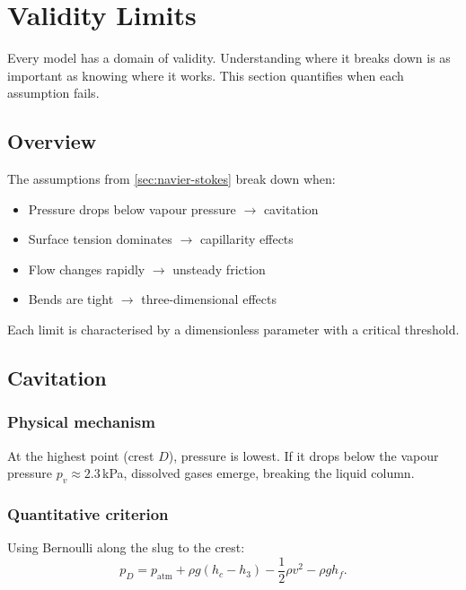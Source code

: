 \documentclass[11pt]{article}
\begin{document}
\section{Validity Limits}
\label{sec:validity}

Every model has a domain of validity. Understanding where it breaks down is as important as knowing where it works. This section quantifies when each assumption fails.

\subsection{Overview}

The assumptions from \cref{sec:navier-stokes} break down when:
\begin{itemize}[nosep,leftmargin=2em]
  \item Pressure drops below vapour pressure $\to$ cavitation
  \item Surface tension dominates $\to$ capillarity effects
  \item Flow changes rapidly $\to$ unsteady friction
  \item Bends are tight $\to$ three-dimensional effects
\end{itemize}

Each limit is characterised by a dimensionless parameter with a critical threshold.

\subsection{Cavitation}

\subsubsection{Physical mechanism}

At the highest point (crest $D$), pressure is lowest. If it drops below the vapour pressure $p_v \approx 2.3$\,kPa, dissolved gases emerge, breaking the liquid column.

\subsubsection{Quantitative criterion}

Using Bernoulli along the slug to the crest:
\[
  p_D = p_{\text{atm}} + \rho g(h_c - h_3) - \frac{1}{2}\rho v^2 - \rho g h_f.
\]
\end{document}
